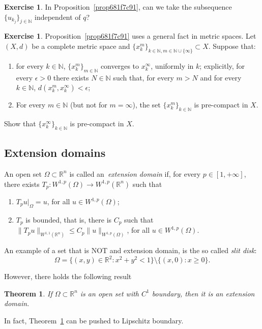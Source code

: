 \documentclass[a4paper,9pt]{amsart}
\newcommand{\N}{\mathbb{N}}	%
\newcommand{\R}{\mathbb{R}}	%
\theoremstyle{plain}
\newtheorem{theorem}[proposition]{Theorem}
\theoremstyle{definition}
\newtheorem{exercise}[proposition]{Exercise}%
\theoremstyle{remark}
\begin{document}
\begin{exercise}
	In Proposition~\ref{prop681f7c91}, can we take the subsequence $\{u_{k_j}\}_{j\in\N}$ independent of $q$?
\end{exercise}

\begin{exercise}
	Proposition~\ref{prop681f7c91} uses a general fact in metric spaces.
	Let $(X,d)$ be a complete metric space and $\{x^m_k\}_{k\in\N,m\in\N\cup\{\infty\}}\subset X$.
	Suppose that:
	\begin{enumerate}
	\item
	for every $k\in\N$, $\{x^m_k\}_{m\in\N}$ converges to $x^\infty_k$, uniformly in $k$;
	explicitly, for every $\epsilon>0$ there exists $N\in\N$ such that, for every $m>N$ and for every $k\in\N$, $d(x^m_k,x^\infty_k) < \epsilon$;
	\item
	For every $m\in\N$ (but not for $m=\infty$), the set $\{x^m_k\}_{k\in\N}$ is pre-compact in $X$.
	\end{enumerate}
	Show that $\{x^\infty_k\}_{k\in\N}$ is pre-compact in $X$.
\end{exercise}


\subsection{Extension domains}
An open set $\Omega\subset\R^n$ is called an~\emph{extension domain} if, for every $p\in[1,+\infty]$, there exists $T_p:W^{1,p}(\Omega) \to W^{1,p}(\R^n)$ such that
\begin{enumerate}
\item	$T_pu|_{\Omega} = u$, for all $u\in W^{1,p}(\Omega)$;
\item	$T_p$ is bounded, that is, there is $C_p$ such that $\|T_pu\|_{W^{1,1}(\R^n)} \le C_p \|u\|_{W^{1,p}(\Omega)}$, for all $u\in W^{1,p}(\Omega)$.
\end{enumerate}

An example of a set that is NOT and extension domain, is the so called \emph{slit disk}:
\begin{equation}
	\Omega = \{(x,y)\in \R^2: x^2+y^2<1\} \setminus \{(x,0):x\ge0\} .
\end{equation}

However, there holds the following result
\begin{theorem}\label{thm681fa38a}
	If $\Omega\subset\R^n$ is an open set with $C^1$ boundary, then it is an extension domain.
\end{theorem}
In fact, Theorem~\ref{thm681fa38a} can be pushed to Lipschitz boundary.
\end{document}
